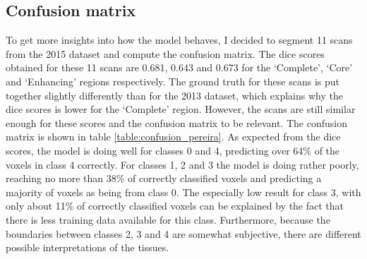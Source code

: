 \documentclass[12pt,a4paper,twoside,openright]{report}
\newlength\figureheight
\newlength\figurewidth
\begin{document}
%
%	


\subsection{Confusion matrix}
To get more insights into how the model behaves, I decided to segment 11 scans from the 2015 dataset and compute the confusion matrix. The dice scores obtained for these 11 scans are 0.681, 0.643 and 0.673 for the `Complete', `Core' and `Enhancing' regions respectively. The ground truth for these scans is put together slightly differently than for the 2013 dataset, which explains why the dice scores is lower for the `Complete' region. However, the scans are still similar enough for these scores and the confusion matrix to be relevant. The confusion matrix is shown in table \ref{table:confusion_pereira}. As expected from the dice scores, the model is doing well for classes 0 and 4, predicting over 64\% of the voxels in class 4 correctly. For classes 1, 2 and 3 the model is doing rather poorly, reaching no more than 38\% of correctly classified voxels and predicting a majority of voxels as being from class 0. The especially low result for class 3, with only about 11\% of correctly classified voxels can be explained by the fact that there is less training data available for this class. Furthermore, because the boundaries between classes 2, 3 and 4 are somewhat subjective, there are different possible interpretations of the tissues.
\end{document}
